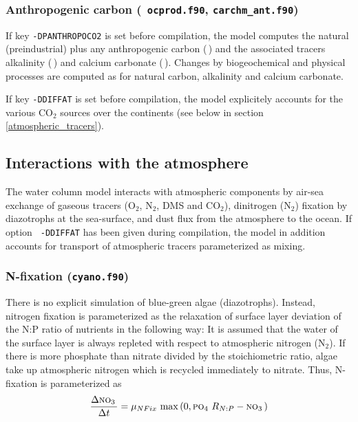 \documentclass[11pt,a4paper,fleqn,twoside]{article}
\def\pho{\text{\textsc{po$_4$}}\,}
\def\nit{\text{\textsc{no$_3$}}\,}
\def\Acar{\text{\textsc{c$_T^A$}}\,}
\def\Aalk{\text{\textsc{a$_T^A$}}\,}
\def\Acal{\text{\textsc{caco$_3^A$}}\,}
\begin{document}
\subsubsection{\label{anthropogenic_tracers}Anthropogenic carbon ({\tt
ocprod.f90},  {\tt carchm\_ant.f90})}

If key {\tt -DPANTHROPOCO2} is set before compilation, the model
computes the natural (preindustrial) plus any anthropogenic carbon (\Acar) 
and the associated tracers alkalinity (\Aalk)  and
calcium carbonate (\Acal). Changes by biogeochemical and physical
processes are computed as for natural carbon, alkalinity and calcium carbonate.

If key {\tt -DDIFFAT} is set before compilation, the model explicitely accounts for
the various CO$_2$ sources over the continents (see below in section
\ref{atmospheric_tracers}).

\subsection{\label{interactions_with_the_atmosphere}Interactions with the
atmosphere}

The water column model interacts with atmospheric components by air-sea
exchange of gaseous tracers (O$_2$, N$_2$, DMS and CO$_2$), dinitrogen (N$_2$)
fixation by diazotrophs at the sea-surface, and dust flux from the
atmosphere to the ocean. If option {\tt
-DDIFFAT} has been given during compilation, the model in addition accounts for
transport of atmospheric tracers parameterized as mixing.

\subsubsection{\label{n_fixation}N-fixation ({\tt cyano.f90})}

There is no explicit simulation of blue-green algae (diazotrophs). Instead,
nitrogen fixation is parameterized as the relaxation of surface layer
deviation of the N:P ratio of nutrients in the following way: It is assumed
that the water of the surface layer is always repleted with respect to
atmospheric nitrogen (N$_2$). If there is more phosphate than nitrate divided
by the stoichiometric ratio, algae take up atmospheric nitrogen which is
recycled immediately to nitrate. Thus, N-fixation is parameterized as
\begin{equation}
\frac{\Delta \nit}{\Delta  t}  =  \mu_{NFix} \, \max\left(0,\pho\,R_{N:P} - \nit\right)
\end{equation}
\end{document}
